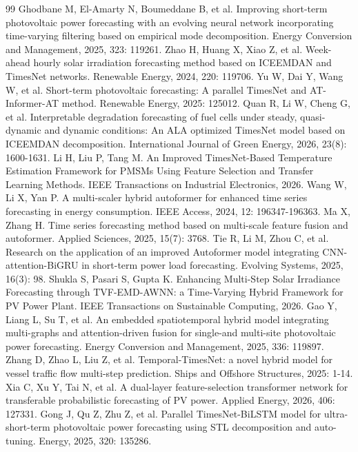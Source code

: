 \documentclass{iopjournal}
\begin{document}
\begin{thebibliography}{99}
 Ghodbane M, El-Amarty N, Boumeddane B, et al. Improving short-term photovoltaic power forecasting with an evolving neural network incorporating time-varying filtering based on empirical mode decomposition. Energy Conversion and Management, 2025, 323: 119261.
 Zhao H, Huang X, Xiao Z, et al. Week-ahead hourly solar irradiation forecasting method based on ICEEMDAN and TimesNet networks. Renewable Energy, 2024, 220: 119706.
 Yu W, Dai Y, Wang W, et al. Short-term photovoltaic forecasting: A parallel TimesNet and AT-Informer-AT method. Renewable Energy, 2025: 125012.
 Quan R, Li W, Cheng G, et al. Interpretable degradation forecasting of fuel cells under steady, quasi-dynamic and dynamic conditions: An ALA optimized TimesNet model based on ICEEMDAN decomposition. International Journal of Green Energy, 2026, 23(8): 1600-1631.
 Li H, Liu P, Tang M. An Improved TimesNet-Based Temperature Estimation Framework for PMSMs Using Feature Selection and Transfer Learning Methods. IEEE Transactions on Industrial Electronics, 2026.
 Wang W, Li X, Yan P. A multi-scaler hybrid autoformer for enhanced time series forecasting in energy consumption. IEEE Access, 2024, 12: 196347-196363.
 Ma X, Zhang H. Time series forecasting method based on multi-scale feature fusion and autoformer. Applied Sciences, 2025, 15(7): 3768.
 Tie R, Li M, Zhou C, et al. Research on the application of an improved Autoformer model integrating CNN-attention-BiGRU in short-term power load forecasting. Evolving Systems, 2025, 16(3): 98.
 Shukla S, Pasari S, Gupta K. Enhancing Multi-Step Solar Irradiance Forecasting through TVF-EMD-AWNN: a Time-Varying Hybrid Framework for PV Power Plant. IEEE Transactions on Sustainable Computing, 2026.
 Gao Y, Liang L, Su T, et al. An embedded spatiotemporal hybrid model integrating multi-graphs and attention-driven fusion for single-and multi-site photovoltaic power forecasting. Energy Conversion and Management, 2025, 336: 119897.
 Zhang D, Zhao L, Liu Z, et al. Temporal-TimesNet: a novel hybrid model for vessel traffic flow multi-step prediction. Ships and Offshore Structures, 2025: 1-14.
 Xia C, Xu Y, Tai N, et al. A dual-layer feature-selection transformer network for transferable probabilistic forecasting of PV power. Applied Energy, 2026, 406: 127331.
 Gong J, Qu Z, Zhu Z, et al. Parallel TimesNet-BiLSTM model for ultra-short-term photovoltaic power forecasting using STL decomposition and auto-tuning. Energy, 2025, 320: 135286.

\end{thebibliography}
\end{document}
